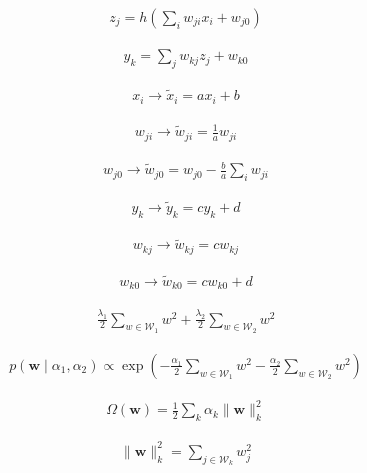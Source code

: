 \documentclass{article}
\begin{document}
\begin{align*}
z_{j}=h\left(\sum_{i} w_{j i} x_{i}+w_{j 0}\right) 
\tag{9.6}
\end{align*}

\begin{align*}
y_{k}=\sum_{j} w_{k j} z_{j}+w_{k 0} 
\tag{9.7}
\end{align*}

\begin{align*}
x_{i} \rightarrow \widetilde{x}_{i}=a x_{i}+b 
\tag{9.8}
\end{align*}

\begin{align*}
w_{j i} \rightarrow \widetilde{w}_{j i}=\frac{1}{a} w_{j i}  
\tag{9.9}
\end{align*}

\begin{align*}
w_{j 0} \rightarrow \widetilde{w}_{j 0}=w_{j 0}-\frac{b}{a} \sum_{i} w_{j i}
\tag{9.10}
\end{align*}

\begin{align*}
y_{k} \rightarrow \widetilde{y}_{k}=c y_{k}+d 
\tag{9.11}
\end{align*}

\begin{align*}
w_{k j} \rightarrow \widetilde{w}_{k j}=c w_{k j}  
\tag{9.12}
\end{align*}

\begin{align*}
w_{k 0} \rightarrow \widetilde{w}_{k 0}=c w_{k 0}+d
\tag{9.13}
\end{align*}

\begin{align*}
\frac{\lambda_{1}}{2} \sum_{w \in \mathcal{W}_{1}} w^{2}+\frac{\lambda_{2}}{2} \sum_{w \in \mathcal{W}_{2}} w^{2} 
\tag{9.14}
\end{align*}

\begin{align*}
p\left(\mathbf{w} \mid \alpha_{1}, \alpha_{2}\right) \propto \exp \left(-\frac{\alpha_{1}}{2} \sum_{w \in \mathcal{W}_{1}} w^{2}-\frac{\alpha_{2}}{2} \sum_{w \in \mathcal{W}_{2}} w^{2}\right)
\tag{9.15}
\end{align*}

\begin{align*}
\Omega(\mathbf{w})=\frac{1}{2} \sum_{k} \alpha_{k}\|\mathbf{w}\|_{k}^{2}
\tag{9.16}
\end{align*}

\begin{align*}
\|\mathbf{w}\|_{k}^{2}=\sum_{j \in \mathcal{W}_{k}} w_{j}^{2}
\tag{9.17}
\end{align*}
\end{document}
